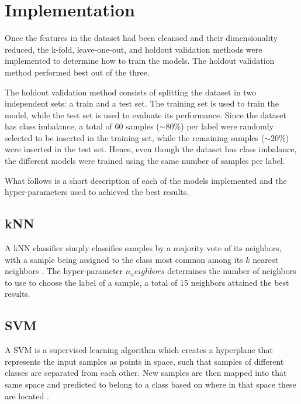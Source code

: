 \section{Implementation} \label{impl}

Once the features in the dataset had been cleansed and their dimensionality reduced, the k-fold, leave-one-out, and holdout validation methods were implemented to determine how to train the models. The holdout validation method performed best out of the three.

The holdout validation method consists of splitting the dataset in two independent sets: a train and a test set. The training set is used to train the model, while the test set is used to evaluate its performance. Since the dataset has class imbalance, a total of 60 samples ($\sim$$80\%$) per label  were randomly selected to be inserted in the training set, while the remaining samples ($\sim$$20\%$) were inserted in the test set. Hence, even though the dataset has class imbalance, the different models were trained using the same number of samples per label.

What follows is a short description of each of the models implemented and the hyper-parameters used to achieved the best results.

\subsection{kNN}

A kNN classifier simply classifies samples by a majority vote of its neighbors, with a sample being assigned to the class most common among its $k$ nearest neighbors \cite{data-mining-intro}. The hyper-parameter $n_neighbors$ determines the number of neighbors to use to choose the label of a sample, a total of 15 neighbors attained the best results.

\subsection{SVM}

A SVM is a supervised learning algorithm which creates a hyperplane that represents the input samples as points in space, such that samples of different classes are separated from each other. New samples are then mapped into that same space and predicted to belong to a class based on where in that space these are located \cite{data-mining-intro}.

